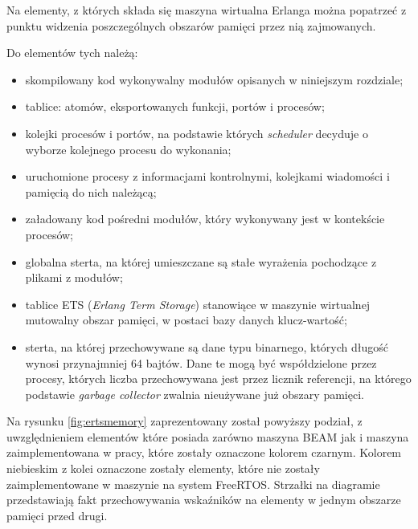 Na elementy, z których składa się maszyna wirtualna Erlanga można popatrzeć z punktu widzenia poszczególnych obszarów pamięci przez nią zajmowanych.

Do elementów tych należą:
\begin{itemize}
\item skompilowany kod wykonywalny modułów opisanych w niniejszym rozdziale;
\item tablice: atomów, eksportowanych funkcji, portów i procesów;
\item kolejki procesów i portów, na podstawie których \emph{scheduler} decyduje o wyborze kolejnego procesu do wykonania;
\item uruchomione procesy z informacjami kontrolnymi, kolejkami wiadomości i pamięcią do nich należącą;
\item załadowany kod pośredni modułów, który wykonywany jest w kontekście procesów;
\item globalna sterta, na której umieszczane są stałe wyrażenia pochodzące z plikami z modułów;
\item tablice ETS (\emph{Erlang Term Storage}) stanowiące w maszynie wirtualnej mutowalny obszar pamięci, w postaci bazy danych klucz-wartość;
\item sterta, na której przechowywane są dane typu binarnego, których długość wynosi przynajmniej 64 bajtów. Dane te mogą być współdzielone przez procesy, których liczba przechowywana jest przez licznik referencji, na którego podstawie \emph{garbage collector} zwalnia nieużywane już obszary pamięci.
\end{itemize}

Na rysunku \ref{fig:ertsmemory} zaprezentowany został powyższy podział, z uwzględnieniem elementów które posiada zarówno maszyna BEAM jak i maszyna zaimplementowana w pracy, które zostały oznaczone kolorem czarnym.
Kolorem niebieskim z kolei oznaczone zostały elementy, które nie zostały zaimplementowane w maszynie na system FreeRTOS.
Strzałki na diagramie przedstawiają fakt przechowywania wskaźników na elementy w jednym obszarze pamięci przed drugi.

